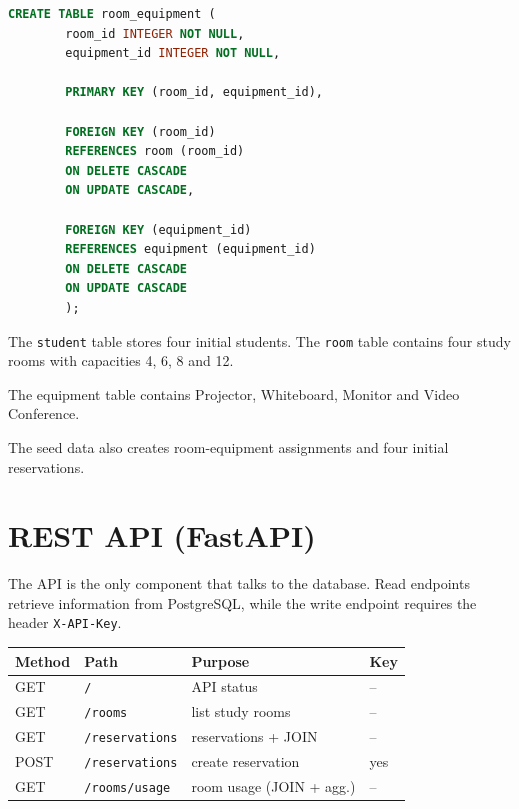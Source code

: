 \documentclass[10pt,a4paper]{article}
\begin{document}
	
	\begin{lstlisting}[language=SQL,
		caption={schema.sql (excerpt) -- room equipment}]
		CREATE TABLE room_equipment (
		room_id INTEGER NOT NULL,
		equipment_id INTEGER NOT NULL,
		
		PRIMARY KEY (room_id, equipment_id),
		
		FOREIGN KEY (room_id)
		REFERENCES room (room_id)
		ON DELETE CASCADE
		ON UPDATE CASCADE,
		
		FOREIGN KEY (equipment_id)
		REFERENCES equipment (equipment_id)
		ON DELETE CASCADE
		ON UPDATE CASCADE
		);
	\end{lstlisting}
	
	The \texttt{student} table stores four initial students. The
	\texttt{room} table contains four study rooms with capacities 4, 6,
	8 and 12.
	
	The equipment table contains Projector, Whiteboard, Monitor and
	Video Conference.
	
	The seed data also creates room-equipment assignments and four
	initial reservations.
	
	
	
	\section{REST API (FastAPI)}
	
	The API is the only component that talks to the database. Read
	endpoints retrieve information from PostgreSQL, while the write
	endpoint requires the header \texttt{X-API-Key}.
	
	\begin{center}
		\begin{tabular}{llll}
			\toprule
			\textbf{Method} & \textbf{Path} & \textbf{Purpose} & \textbf{Key}\\
			\midrule
			GET  & \texttt{/} &
			API status &
			-- \\
			
			GET  & \texttt{/rooms} &
			list study rooms &
			-- \\
			
			GET  & \texttt{/reservations} &
			reservations + JOIN &
			-- \\
			
			POST & \texttt{/reservations} &
			create reservation &
			yes \\
			
			GET & \texttt{/rooms/usage} &
			room usage (JOIN + agg.) &
			-- \\
			
			\bottomrule
		\end{tabular}
	\end{center}
	
\end{document}
